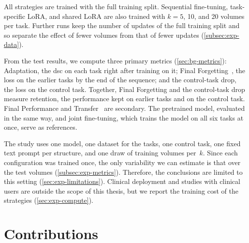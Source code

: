 All strategies are trained with the full training split.
Sequential fine-tuning, task-specific LoRA, and shared LoRA are also trained with $k = 5$, 10, and 20 volumes per task.
Further runs keep the number of updates of the full training split and so separate the effect of fewer volumes from that of fewer updates (\cref{subsec:exp-data}).

From the test results, we compute three primary metrics (\cref{sec:bg-metrics}): Adaptation, the \gls{dsc} on each task right after training on it; Final Forgetting~\cite{Chaudhry_2018}, the loss on the earlier tasks by the end of the sequence; and the control-task drop, the loss on the control task.
Together, Final Forgetting and the control-task drop measure retention, the performance kept on earlier tasks and on the control task.
Final Performance and Transfer~\cite{zheng2023preventingzeroshottransferdegradation} are secondary.
The pretrained model, evaluated in the same way, and joint fine-tuning, which trains the model on all six tasks at once, serve as references.

The study uses one model, one dataset for the tasks, one control task, one fixed text prompt per structure, and one draw of training volumes per~$k$.
Since each configuration was trained once, the only variability we can estimate is that over the test volumes (\cref{subsec:exp-metrics}).
Therefore, the conclusions are limited to this setting (\cref{sec:exp-limitations}).
Clinical deployment and studies with clinical users are outside the scope of this thesis, but we report the training cost of the strategies (\cref{sec:exp-compute}).

\section{Contributions}
\label{sec:intro-contributions}

